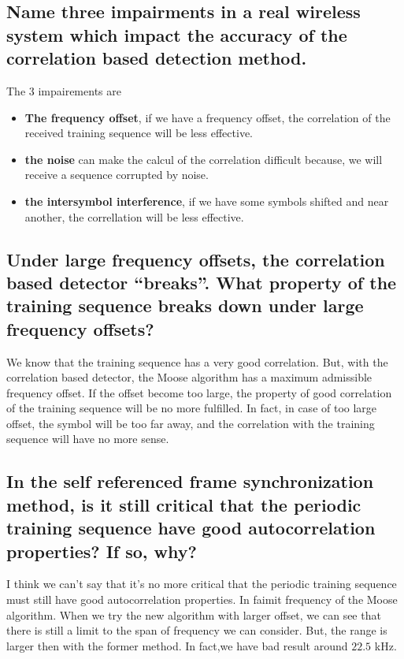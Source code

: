 \documentclass[frenchb, oneside, headings=normal]{scrartcl}
\begin{document}
\subsection{Name three impairments in a real wireless system which impact the accuracy of the correlation based detection method.}

The 3 impairements are\\ 

\begin{itemize}

\item \textbf{The frequency offset}, if we have a frequency offset, the correlation of the received training sequence will be less effective.

\item \textbf{the noise} can make the calcul of the correlation difficult because, we will receive a sequence corrupted by noise.

\item \textbf{the intersymbol interference}, if we have some symbols shifted and near another, the correllation will be less effective.
\end{itemize}

\subsection{Under large frequency offsets, the correlation based detector “breaks”. What property of the training sequence breaks down under large frequency offsets?}

We know that the training sequence has a very good correlation. But, with the correlation based detector, the Moose algorithm has a maximum admissible frequency offset. If the offset become too large, the property of good correlation of the training sequence will be no more fulfilled. In fact, in case of too large offset, the symbol will be too far away, and the correlation with the training sequence will have no more sense.

\subsection{In the self referenced frame synchronization method, is it still critical that the periodic training sequence have good autocorrelation properties? If so, why?}

I think we can't say that it's no more critical that the periodic training sequence must still have good autocorrelation properties. In faimit frequency of the Moose algorithm. When we try the new algorithm with larger offset, we can see that there is still a limit to the span of frequency we can consider. But, the range is larger then with the former method. In fact,we have bad result around $22.5$ \si{\kilo\hertz}.
\end{document}
